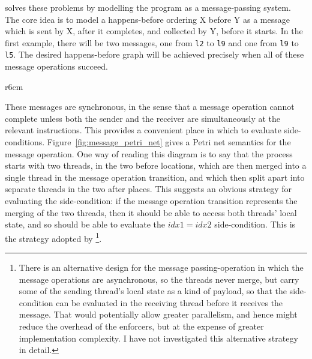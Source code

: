 {\Technique} solves these problems by modelling the program as a
message-passing system.  The core idea is to model a happens-before
ordering X before Y as a message which is sent by X, after it
completes, and collected by Y, before it starts.  In the first
example, there will be two messages, one from \texttt{l2} to
\texttt{l9} and one from \texttt{l9} to \texttt{l5}.  The desired
happens-before graph will be achieved precisely when all of these
message operations succeed.

\begin{wrapfigure}{r}{6cm}
  \vspace{-10pt}
  \hspace{-5pt}
  \caption{Petri net for the message operation.}
  \label{fig:message_petri_net}
  \vspace{-10pt}
\end{wrapfigure}
These messages are synchronous, in the sense that a message operation
cannot complete unless both the sender and the receiver are
simultaneously at the relevant instructions.  This provides a
convenient place in which to evaluate side-conditions.
Figure~\ref{fig:message_petri_net} gives a Petri net semantics for the
message operation.  One way of reading this diagram is to say that the
process starts with two threads, in the two before locations, which
are then merged into a single thread in the message operation
transition, and which then split apart into separate threads in the
two after places.  This suggests an obvious strategy for evaluating
the side-condition: if the message operation transition represents the
merging of the two threads, then it should be able to access both
threads' local state, and so should be able to evaluate the
$\mathit{idx1} = \mathit{idx2}$ side-condition.  This is the strategy
adopted by {\implementation}\footnote{There is an alternative design
  for the message passing-operation in which the message operations
  are asynchronous, so the threads never merge, but carry some of the
  sending thread's local state as a kind of payload, so that the
  side-condition can be evaluated in the receiving thread before it
  receives the message.  That would potentially allow greater
  parallelism, and hence might reduce the overhead of the enforcers,
  but at the expense of greater implementation complexity.  I have not
  investigated this alternative strategy in detail.}.


